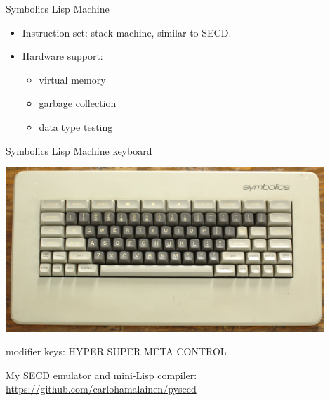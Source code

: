 \documentclass[professionalFonts]{beamer}
\begin{document}
\begin{frame}

Symbolics Lisp Machine

\begin{itemize}

\item Instruction set: stack machine, similar to SECD.

\item Hardware support:

    \begin{itemize}
    \item virtual memory
    \item garbage collection
    \item data type testing
    \end{itemize}


\end{itemize}

\end{frame}

\begin{frame}

Symbolics Lisp Machine keyboard

\begin{center}
\includegraphics[width=12cm]{Symbolics-keyboard.jpg}
\end{center}

modifier keys: HYPER SUPER META CONTROL

\end{frame}

\begin{frame}[References]

My SECD emulator and mini-Lisp compiler: \url{https://github.com/carlohamalainen/pysecd}

\end{frame}
\end{document}
